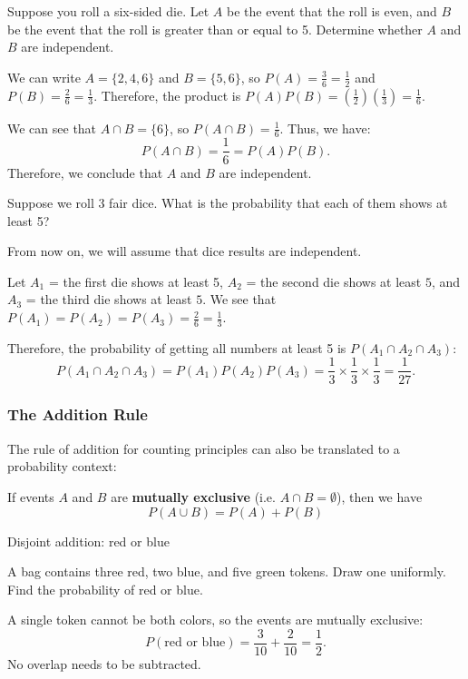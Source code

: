 \begin{frame}[t]
\begin{ex}
Suppose you roll a six-sided die. Let $A$ be the event that the roll is even, and $B$ be the event that the roll is greater than or equal to 5. Determine whether $A$ and $B$ are independent.
\end{ex}
\begin{sol}
We can write $A = \{2,4,6\}$ and $B = \{5,6\}$, so $P(A) = \frac{3}{6} = \frac{1}{2}$ and $P(B) = \frac{2}{6} = \frac{1}{3}$. Therefore, the product is $P(A) P(B) = \left( \frac{1}{2} \right) \left( \frac{1}{3} \right) = \frac{1}{6}$.
\medskip

We can see that $A \cap B = \{6\}$, so $P(A \cap B) = \frac{1}{6}$. Thus, we have:
\[P(A \cap B) = \frac{1}{6} = P(A)P(B).\]
Therefore, we conclude that $A$ and $B$ are independent.
\end{sol}
\end{frame}

 
\begin{frame}[t] 
\begin{ex} 
Suppose we roll 3 fair dice. What is the probability that each of them shows at least 5?
\end{ex} 
\begin{sol}
From now on, we will assume that dice results are independent.
\medskip
 
Let $A_1$ = the first die shows at least 5, $A_2$ = the second die shows at least $5$, and $A_3$ = the third die shows at least $5$. We see that $P(A_1) = P(A_2) = P(A_3) = \frac{2}{6} = \frac{1}{3}$. 

\medskip 
Therefore, the probability of getting all numbers at least 5 is $P(A_1 \cap A_2 \cap A_3)$:
\[P(A_1 \cap A_2 \cap A_3) = P(A_1) P(A_2) P(A_3) = \frac{1}{3} \times \frac{1}{3} \times \frac{1}{3} = \frac{1}{27}.\]
\end{sol}
\end{frame}

\begin{frame}
\frametitle{The Addition Rule}
The rule of addition for counting principles can also be translated to a probability context:
\begin{thm}{}{}
If events $A$ and $B$ are \textbf{mutually exclusive} (i.e. $A \cap B = \emptyset$), then we have
\begin{equation}
P(A \cup B) = P(A) + P(B)
\end{equation}
\end{thm}
\end{frame}
\begin{frame}[t]{Disjoint addition: red or blue}
\small
\begin{ex}
A bag contains three red, two blue, and five green tokens. Draw one uniformly. Find the probability of red or blue.
\end{ex}
\begin{sol}
A single token cannot be both colors, so the events are mutually exclusive:\[P(\text{red or blue})=\frac{3}{10}+\frac{2}{10}=\frac12.\] No overlap needs to be subtracted.
\end{sol}
\end{frame}


